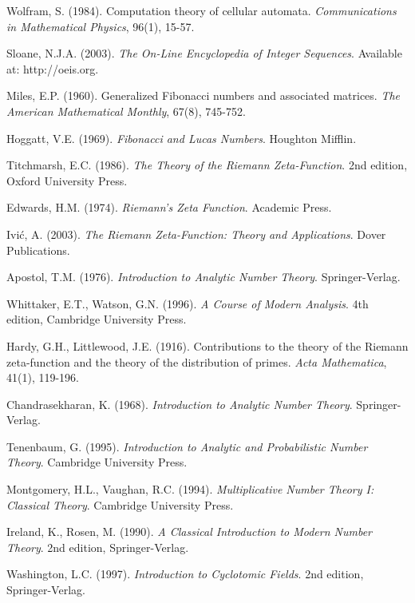 \documentclass[12pt]{article}
\theoremstyle{plain}
\theoremstyle{definition}
\begin{document}
\begin{thebibliography}{99}
 Wolfram, S. (1984). Computation theory of cellular automata. \emph{Communications in Mathematical Physics}, 96(1), 15-57.

 Sloane, N.J.A. (2003). \emph{The On-Line Encyclopedia of Integer Sequences}. Available at: http://oeis.org.

 Miles, E.P. (1960). Generalized Fibonacci numbers and associated matrices. \emph{The American Mathematical Monthly}, 67(8), 745-752.

 Hoggatt, V.E. (1969). \emph{Fibonacci and Lucas Numbers}. Houghton Mifflin.

 Titchmarsh, E.C. (1986). \emph{The Theory of the Riemann Zeta-Function}. 2nd edition, Oxford University Press.

 Edwards, H.M. (1974). \emph{Riemann's Zeta Function}. Academic Press.

 Ivić, A. (2003). \emph{The Riemann Zeta-Function: Theory and Applications}. Dover Publications.

 Apostol, T.M. (1976). \emph{Introduction to Analytic Number Theory}. Springer-Verlag.

 Whittaker, E.T., Watson, G.N. (1996). \emph{A Course of Modern Analysis}. 4th edition, Cambridge University Press.

 Hardy, G.H., Littlewood, J.E. (1916). Contributions to the theory of the Riemann zeta-function and the theory of the distribution of primes. \emph{Acta Mathematica}, 41(1), 119-196.

 Chandrasekharan, K. (1968). \emph{Introduction to Analytic Number Theory}. Springer-Verlag.

 Tenenbaum, G. (1995). \emph{Introduction to Analytic and Probabilistic Number Theory}. Cambridge University Press.

 Montgomery, H.L., Vaughan, R.C. (1994). \emph{Multiplicative Number Theory I: Classical Theory}. Cambridge University Press.

 Ireland, K., Rosen, M. (1990). \emph{A Classical Introduction to Modern Number Theory}. 2nd edition, Springer-Verlag.

 Washington, L.C. (1997). \emph{Introduction to Cyclotomic Fields}. 2nd edition, Springer-Verlag.


\end{thebibliography}
\end{document}
